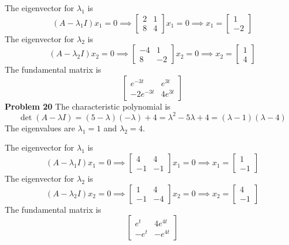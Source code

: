 The eigenvector for $\lambda_1$ is
\[
    (A-\lambda_1 I)x_1 = 0
    \implies 
    \begin{bmatrix}
        2 & 1 \\
        8 & 4
    \end{bmatrix} x_1 = 0
    \implies x_1 = 
    \begin{bmatrix}
        1 \\ -2
    \end{bmatrix}
\]
The eigenvector for $\lambda_2$ is 
\[
    (A-\lambda_2 I)x_2 = 0
    \implies 
    \begin{bmatrix}
        -4 & 1 \\
        8 & -2
    \end{bmatrix} x_2 = 0
    \implies x_2 = 
    \begin{bmatrix}
        1 \\ 4
    \end{bmatrix}
\]
The fundamental matrix is
\[
    \begin{bmatrix}
        e^{-3t} & e^{3t} \\
        -2e^{-3t} & 4e^{3t}
    \end{bmatrix}
\]
\textbf{Problem 20}
The characteristic polynomial is 
\[
    \det(A-\lambda I)
    = (5-\lambda)(-\lambda) + 4
    = \lambda^2 - 5\lambda + 4
    = (\lambda-1)(\lambda-4)
\]
The eigenvalues are $\lambda_1 = 1$ and $\lambda_2 = 4$.

The eigenvector for $\lambda_1$ is 
\[
    (A-\lambda_1 I)x_1 = 0
    \implies 
    \begin{bmatrix}
        4 & 4 \\
        -1 & -1
    \end{bmatrix} x_1 = 0
    \implies x_1 = 
    \begin{bmatrix}
        1 \\ -1
    \end{bmatrix}
\]
The eigenvector for $\lambda_2$ is 
\[
    (A-\lambda_2 I)x_2 = 0
    \implies 
    \begin{bmatrix}
        1 & 4 \\
        -1 & -4
    \end{bmatrix} x_2 = 0
    \implies x_2 = 
    \begin{bmatrix}
        4 \\ -1
    \end{bmatrix}
\]
The fundamental matrix is 
\[
    \begin{bmatrix}
        e^t & 4e^{4t} \\
        -e^t & -e^{4t}
    \end{bmatrix}
\]